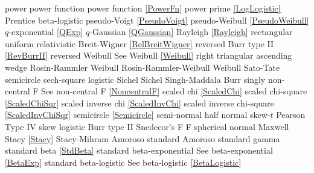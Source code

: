 power						\dotfill	power function 						\ncite	%
power function					\dotfill	\eqref{PowerFn}					\ncite	%
power prime					\dotfill	\eqref{LogLogistic}					\mcite{\self}
Prentice 						\dotfill	beta-logistic							
pseudo-Voigt					\dotfill	\eqref{PseudoVoigt}					\ncite
pseudo-Weibull					\dotfill	\eqref{PseudoWeibull}				\ncite	%
%
$q$-exponential				\dotfill	\eqref{QExp}						\ncite	%
$q$-Gaussian					\dotfill	\eqref{QGaussian}					\ncite	%
%
Rayleigh  						\dotfill	\eqref{Rayleigh}					\ncite	%
rectangular					\dotfill	uniform 							\ncite	%
relativistic Breit-Wigner			\dotfill	\eqref{RelBreitWigner}				\ncite	%
reversed Burr type II				\dotfill	\eqref{RevBurrII} 					\ncite	%
reversed Weibull				\dotfill	See Weibull \eqref{Weibull}			\ncite	%
right triangular					\dotfill	ascending wedge 					\ncite	%
Rosin-Rammler 				\dotfill	Weibull							   		%
Rosin-Rammler-Weibull 			\dotfill	Weibull							\ncite	%
%
Sato-Tate						\dotfill	semicircle 						\ncite	%
sech-square 					\dotfill	logistic							\ncite	%
Sichel						\dotfill	Sichel							\ncite	
Singh-Maddala 					\dotfill	Burr 								\ncite	%
singly non-central F       			 \dotfill	See non-central F  \eqref{NoncentralF}	\ncite 
scaled chi						\dotfill	\eqref{ScaledChi}					\ncite	%
scaled chi-square 				\dotfill	\eqref{ScaledChiSqr}					\ncite	%
scaled inverse chi 				\dotfill	\eqref{ScaledInvChi}					\ncite	%
scaled inverse chi-square 			\dotfill	\eqref{ScaledInvChiSqr}				 	%
semicircle						\dotfill	\eqref{Semicircle}					\ncite	%
semi-normal 					\dotfill	half normal 						\ncite	%
skew-$t$						\dotfill	Pearson Type IV 					\ncite	%
skew logistic					\dotfill	Burr type II 						\ncite	%
Snedecor's F  					\dotfill	F 								\ncite	%
spherical normal				\dotfill	Maxwell							\ncite	%
Stacy 						\dotfill	\eqref{Stacy} 						\ncite	%
Stacy-Mihram					\dotfill	Amoroso							\ncite	%
standard Amoroso				\dotfill	standard gamma 					\ncite	%
standard beta					\dotfill	\eqref{StdBeta} 					\ncite	%
standard beta-exponential			\dotfill	See beta-exponential \eqref{BetaExp}	\ncite	%
standard beta-logistic			\dotfill	See beta-logistic \eqref{BetaLogistic}		\ncite	%
